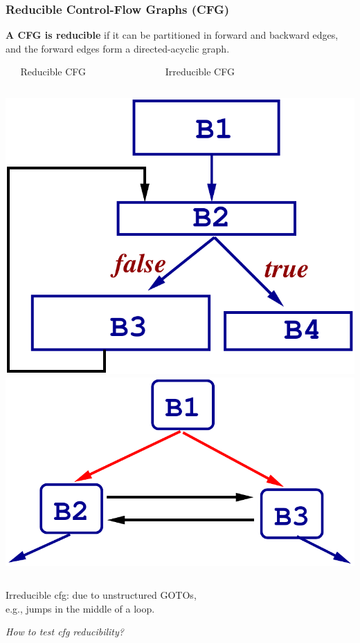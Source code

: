 \documentclass{beamer}
\newcommand{\emp}[1]{\textcolor{DikuRed}{ #1}}
\begin{document}
\begin{frame}[fragile,t]
    \frametitle{Reducible Control-Flow Graphs ({\sc CFG})}



{\bf A CFG is reducible} if it can be partitioned in forward and backward
edges, and the forward edges form a directed-acyclic graph.\smallskip

\begin{block}{{\tt~~~}Reducible CFG{\tt~~~~~~~~~~~~~~~~}Irreducible CFG}
\begin{columns}
\includegraphics[width=20ex]{Figures/CFGred}
\includegraphics[width=20ex]{Figures/LoopUnstruct}
\end{columns}
\end{block}

\smallskip

Irreducible {\sc cfg}: due to unstructured GOTOs,\\e.g., jumps in the middle of a loop.

\smallskip

\emp{\em How to test {\sc cfg} reducibility?}

\end{frame}
\end{document}
